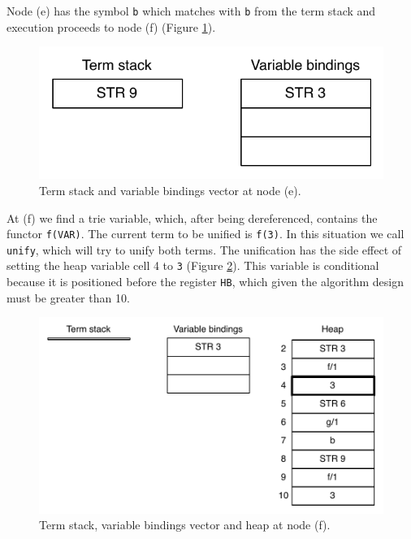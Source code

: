Node (e) has the symbol \texttt{b} which matches with \texttt{b} from the term stack and
execution proceeds to node (f) (Figure \ref{fig:collect_functor4}).

\begin{figure}[H]
  \centering
    \includegraphics[scale=0.6]{collect_functor4.pdf}
  \caption{Term stack and variable bindings vector at node (e).}
  \label{fig:collect_functor4}
\end{figure}

At (f) we find a trie variable, which, after being dereferenced, contains the
functor \texttt{f(VAR)}. The current term to be unified is \texttt{f(3)}.
In this situation we call \texttt{unify}, which will try to unify both terms.
The unification has the side effect of setting the heap variable cell 4 to \texttt{3}
(Figure \ref{fig:collect_functor5}).
This variable is conditional because it is positioned before the register \texttt{HB},
which given the algorithm design must be greater than 10.

\begin{figure}[H]
  \centering
    \includegraphics[scale=0.6]{collect_functor5.pdf}
  \caption{Term stack, variable bindings vector and heap at node (f).}
  \label{fig:collect_functor5}
\end{figure}

